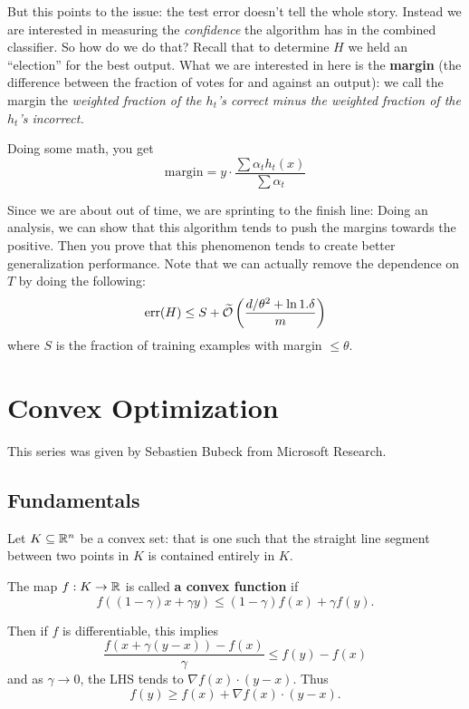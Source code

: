 \documentclass[12pt]{article}
\DeclareMathOperator{\err}{err}
\begin{document}
But this points to the issue: the test error doesn't tell the whole story. Instead we are interested in measuring the \textit{confidence} the algorithm has in the combined classifier. So how do we do that?
Recall that to determine $H$ we held an ``election'' for the best output. What we are interested in here is the \textbf{margin} (the difference between the fraction of votes for and against an output):
we call the margin the \textit{weighted fraction of the $h_t$'s correct minus the weighted fraction of the $h_t$'s incorrect.}

Doing some math, you get 
\[\text{margin}=y\cdot\frac{\sum \alpha_t h_t(x)}{\sum\alpha_t}\]

Since we are about out of time, we are sprinting to the finish line: Doing an analysis, we can show that this algorithm tends to push the margins towards the positive. Then you prove that 
this phenomenon tends to create better generalization performance. Note that we can actually remove the dependence on $T$ by doing the following:
\[\err(H)\le S+\tilde\calO\left(\frac{d/\theta^2+\ln 1.\delta}{m}\right)\]
where $S$ is the fraction of training examples with margin $\le\theta$.


\pagebreak

\section{Convex Optimization}
This series was given by Sebastien Bubeck from Microsoft Research.

\subsection{Fundamentals}
Let $K\subseteq \mathbb{R}^n$ be a convex set: that is one such that the straight line segment between two points in $K$ is contained entirely in $K$.
\begin{defn}
	The map $f:K\to\mathbb{R}$ is called \textbf{a convex function} if 
	\[f((1-\gamma)x+\gamma y)\le (1-\gamma)f(x)+\gamma f(y).\]
\end{defn}
\begin{rmk}
	Then if $f$ is differentiable, this implies
	\[\frac{f(x+\gamma(y-x))-f(x)}{\gamma}\le f(y)-f(x)\]
	and as $\gamma\to 0$, the LHS tends to $\nabla f(x)\cdot (y-x)$. Thus
	\[f(y)\ge f(x)+\nabla f(x)\cdot(y-x).\]
\end{rmk}
\end{document}
